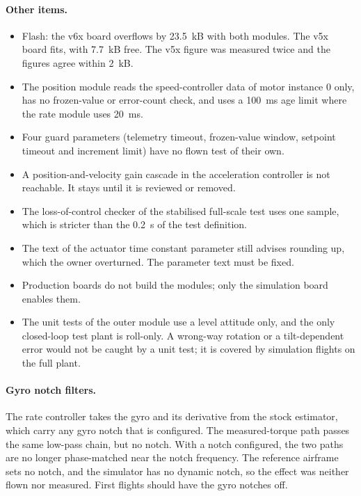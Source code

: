 \paragraph{Other items.}
\begin{itemize}
  \item Flash: the v6x board overflows by 23.5~kB with both modules. The v5x board fits, with 7.7~kB free. The v5x figure was measured twice and the figures agree within 2~kB.
  \item The position module reads the speed-controller data of motor instance 0 only, has no frozen-value or error-count check, and uses a 100~ms age limit where the rate module uses 20~ms.
  \item Four guard parameters (telemetry timeout, frozen-value window, setpoint timeout and increment limit) have no flown test of their own.
  \item A position-and-velocity gain cascade in the acceleration controller is not reachable. It stays until it is reviewed or removed.
  \item The loss-of-control checker of the stabilised full-scale test uses one sample, which is stricter than the 0.2~s of the test definition.
  \item The text of the actuator time constant parameter still advises rounding up, which the owner overturned. The parameter text must be fixed.
  \item Production boards do not build the modules; only the simulation board enables them.
  \item The unit tests of the outer module use a level attitude only, and the only closed-loop test plant is roll-only. A wrong-way rotation or a tilt-dependent error would not be caught by a unit test; it is covered by simulation flights on the full plant.
\end{itemize}

\paragraph{Gyro notch filters.}
The rate controller takes the gyro and its derivative from the stock estimator, which carry any gyro notch that is configured.
The measured-torque path passes the same low-pass chain, but no notch.
With a notch configured, the two paths are no longer phase-matched near the notch frequency.
The reference airframe sets no notch, and the simulator has no dynamic notch, so the effect was neither flown nor measured.
First flights should have the gyro notches off.

